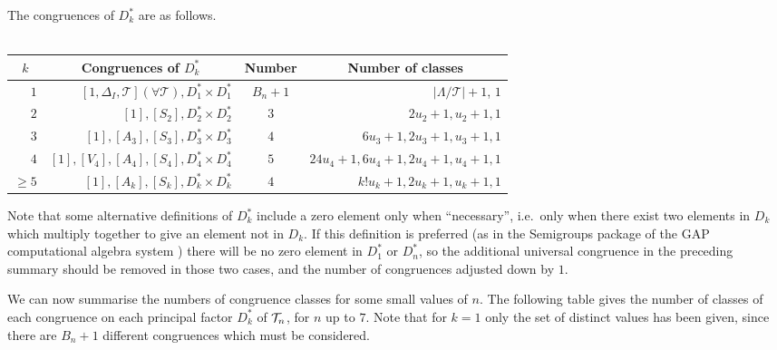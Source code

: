 \begin{theorem}
  \label{thm:dkstar-congs}
The congruences of $D_k^*$ are as follows.
\\ \\
  \begin{tabular}{| r | r | c | r |}
    \hline
    \multicolumn{1}{|c|}{$k$} & \multicolumn{1}{|c|}{\textbf{Congruences of $D_k^*$}} & \textbf{Number} & \multicolumn{1}{|c|}{\textbf{Number of classes}} \\
    \hline
    $1$ & $[1, \Delta_I, \mathcal{T}] (\forall \mathcal{T}), D_1^* \times D_1^*$ & $B_n + 1$
    & $|\Lambda/\mathcal{T}|+1$, $1$ \\
    $2$ & $[1], [S_2], D_2^* \times D_2^*$ & $3$ & $2u_2+1, u_2+1, 1$ \\
    $3$ & $[1], [A_3], [S_3], D_3^* \times D_3^*$ & $4$ & $6u_3+1, 2u_3+1, u_3+1, 1$ \\
    $4$ & $[1], [V_4], [A_4], [S_4], D_4^* \times D_4^*$ & $5$ & $24u_4+1, 6u_4+1, 2u_4+1, u_4+1, 1$ \\
    $\geq 5$ & $[1], [A_k], [S_k], D_k^* \times D_k^*$ & $4$ & $k!u_k+1, 2u_k+1, u_k+1, 1$ \\
    \hline
  \end{tabular}
\end{theorem}

Note that some alternative definitions of $D_k^*$ include a zero element only
when ``necessary'', i.e.~only when there exist two elements in $D_k$ which multiply together to
give an element not in $D_k$.  If this definition is preferred (as in the
Semigroups package \cite{semigroups} of the GAP computational algebra
system \cite{gap}) there will be no zero element in $D_1^*$ or $D_n^*$, so the
additional universal congruence in the preceding summary should be removed in
those two cases, and the number of congruences adjusted down by $1$.

We can now summarise the numbers of congruence classes for some small values of
$n$.  The following table gives the number of classes of each congruence on each
principal factor $D_k^*$ of $\mathcal{T}_n$, for $n$ up to $7$.  Note that for $k=1$ only
the set of distinct values has been given, since there are $B_n+1$ different
congruences which must be considered.

